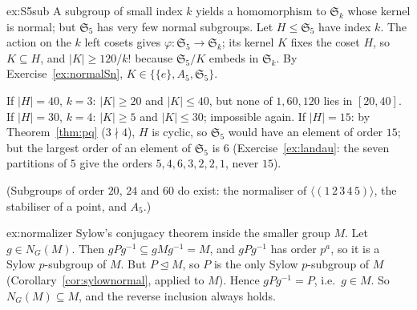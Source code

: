 \begin{solution}{ex:S5sub}
\idea A subgroup of small index $k$ yields a homomorphism to $\mathfrak S_k$ whose kernel is normal; but $\mathfrak S_5$ has very few normal subgroups.
\writeup Let $H\le\mathfrak S_5$ have index $k$. The action on the $k$ left cosets gives $\varphi:\mathfrak S_5\to\mathfrak S_k$; its kernel $K$ fixes the coset $H$, so $K\subseteq H$, and $|K|\ge120/k!$ because $\mathfrak S_5/K$ embeds in $\mathfrak S_k$. By Exercise~\ref{ex:normalSn}, $K\in\{\{e\},A_5,\mathfrak S_5\}$.

If $|H|=40$, $k=3$: $|K|\ge20$ and $|K|\le40$, but none of $1,60,120$ lies in $[20,40]$. If $|H|=30$, $k=4$: $|K|\ge5$ and $|K|\le30$; impossible again. If $|H|=15$: by Theorem~\ref{thm:pq} ($3\nmid4$), $H$ is cyclic, so $\mathfrak S_5$ would have an element of order $15$; but the largest order of an element of $\mathfrak S_5$ is $6$ (Exercise~\ref{ex:landau}: the seven partitions of $5$ give the orders $5,4,6,3,2,2,1$, never $15$).

(Subgroups of order $20$, $24$ and $60$ do exist: the normaliser of $\langle(1\,2\,3\,4\,5)\rangle$, the stabiliser of a point, and $A_5$.)
\end{solution}

\begin{solution}{ex:normalizer}
\idea Sylow's conjugacy theorem inside the smaller group $M$.
\writeup Let $g\in N_G(M)$. Then $gPg^{-1}\subseteq gMg^{-1}=M$, and $gPg^{-1}$ has order $p^a$, so it is a Sylow $p$-subgroup of $M$. But $P\trianglelefteq M$, so $P$ is the only Sylow $p$-subgroup of $M$ (Corollary~\ref{cor:sylownormal}, applied to $M$). Hence $gPg^{-1}=P$, i.e.\ $g\in M$. So $N_G(M)\subseteq M$, and the reverse inclusion always holds.
\end{solution}

